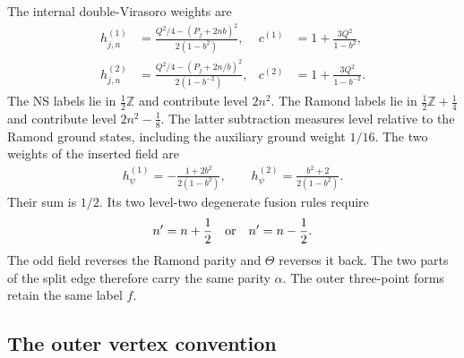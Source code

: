 \documentclass[12pt]{article}
\newcommand{\ie}{\begin{equation}\begin{aligned}}
\newcommand{\fe}{\end{aligned}\end{equation}}
\numberwithin{equation}{section}
\begin{document}
The internal double-Virasoro weights are
\ie
 h_{j,n}^{(1)}&=\frac{Q^2/4-(P_j+2nb)^2}{2(1-b^2)},&
 c^{(1)}&=1+\frac{3Q^2}{1-b^2},\\
 h_{j,n}^{(2)}&=\frac{Q^2/4-(P_j+2n/b)^2}{2(1-b^{-2})},&
 c^{(2)}&=1+\frac{3Q^2}{1-b^{-2}}.
\fe
The NS labels lie in $\frac12\mathbb Z$ and contribute level $2n^2$.
The Ramond labels lie in $\frac12\mathbb Z+\frac14$ and contribute level
$2n^2-\frac18$.  The latter subtraction measures level relative to the
Ramond ground states, including the auxiliary ground weight $1/16$.
The two weights of the inserted field are
\ie
 h_\psi^{(1)}=-\frac{1+2b^2}{2(1-b^2)},\qquad
 h_\psi^{(2)}=\frac{b^2+2}{2(1-b^2)}.
\fe
Their sum is $1/2$.  Its two level-two degenerate fusion rules require
\ie
 n'=n+\frac12\quad\hbox{or}\quad n'=n-\frac12.
 \label{middle-fusion}
\fe
The odd field reverses the Ramond parity and $\Theta$ reverses it back.
The two parts of the split edge therefore carry the same parity $\alpha$.
The outer three-point forms retain the same label $f$.

\subsection{The outer vertex convention}
\end{document}
